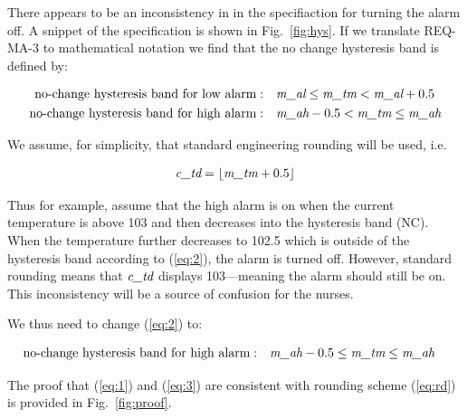 There appears to be an inconsistency in \cite{REMH} in the specifiaction for turning the alarm off. A  snippet of the specification is shown in Fig.~\ref{fig:hys}. If we translate REQ-MA-3 to mathematical notation we find that the no change hysteresis band is defined by:

\begin{align}
\textrm{no-change hysteresis band for low alarm}: \quad &\label{eq:1}
\textit{m\_al} \leq \textit{m\_tm} < \textit{m\_al}+ 0.5\\
\textrm{no-change hysteresis band for high alarm}: \quad &\label{eq:2}
\textit{m\_ah} -0.5 < \textit{m\_tm} \leq \textit{m\_ah} 
\end{align}

\noindent We assume, for simplicity, that standard engineering rounding will be used, i.e.

\begin{align}
\textit{c\_td} = \lfloor \textit{m\_tm} + 0.5\rfloor \label{eq:rd}
\end{align}

\noindent Thus for example, assume that the high alarm is on when the current temperature is above 103 and then decreases into the hysteresis band (NC). When the temperature further decreases to 102.5 which is outside of the hysteresis band according to (\ref{eq:2}), the alarm is turned off. However, standard rounding means that $\textit{c\_td}$ displays 103---meaning the alarm should still be on. This inconsistency will be a source of confusion for the nurses.

We thus need to change  (\ref{eq:2}) to:

\begin{align}
\textrm{no-change hysteresis band for high alarm}: \quad &\label{eq:3}
\textit{m\_ah} -0.5 \leq \textit{m\_tm} \leq \textit{m\_ah} 
\end{align}

\noindent The proof that (\ref{eq:1}) and (\ref{eq:3}) are consistent with rounding scheme (\ref{eq:rd}) is provided in Fig.~\ref{fig:proof}.


